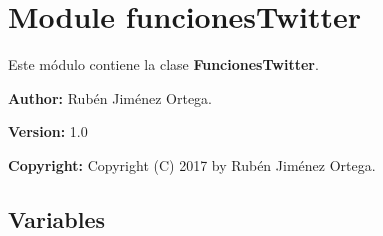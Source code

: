 %
%
%


\section{Module funcionesTwitter}

    \label{funcionesTwitter}
Este módulo contiene la clase \textbf{FuncionesTwitter}.

\textbf{Author:} Rubén Jiménez Ortega.



\textbf{Version:} 1.0



\textbf{Copyright:} Copyright (C) 2017 by Rubén Jiménez Ortega.





  \subsection{Variables}


